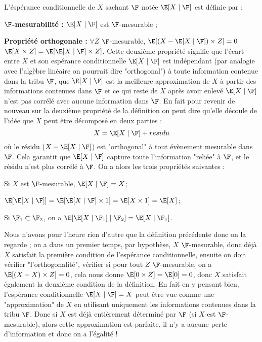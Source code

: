 L'éspérance conditionnelle de $X$ sachant $\F$ notée $\E[X \mid \F]$ est définie par :
\ben
    \item \textbf{$\F$-mesurabilité :} $\E[X\mid \F]$ est $\F$-mesurable ;
    \item \textbf{Propriété orthogonale :} $\forall Z$ $\F$-mesurable, $\E[(X - \E[X \mid \F])\times Z ] = 0$ \ssi $\E[X\times Z] = \E[\E[X\mid \F] \times Z]$.
    \bn
    Cette deuxième propriété signifie que l'écart entre $X$ et son espérance conditionnelle $\E[X\mid \F]$ est indépendant (par analogie avec l'algèbre linéaire on pourrait dire "orthogonal") à toute information contenue dans la tribu $\F$, \ie que $\E[X\mid \F]$ est la meilleure approximation de $X$ à partir des informations contenues dans $\F$ et ce qui reste de $X$ après avoir enlevé $\E[X\mid \F]$ n'est pas corrélé avec aucune information dans $\F$.
    \en
\een
\ed
{} En fait pour revenir de nouveau sur la deuxième propriété de la définition on peut dire qu'elle découle de l'idée que $X$ peut être décomposé en deux parties : $$X = \E[X\mid \F] + residu$$ où le résidu ($X- \E[X\mid \F]$) est "orthogonal" à tout évènement mesurable dans $\F$. Cela garantit que $\E[X\mid \F]$ capture toute l'information "reliée" à $\F$, et le résidu n'est plus corrélé à $\F$.
\bp
On a alors les trois propriétés suivantes :
\ben
    \item Si $X$ est $\F$-mesurable, $\E[X\mid \F] = X$;
    \item $\E[\E[X\mid \F]] = \E[\E[X\mid \F]\times 1] = \E[X \times 1] = \E[X]$;
    \item Si $\F_1 \subset \F_2$, on a $\E[\E[X\mid \F_1]\mid \F_2] = \E[X\mid \F_1]$.
\een
\ep
\bpf[(esquisse)]
\ben
    \item Nous n'avons pour l'heure rien d'autre que la définition précédente donc on la regarde  ; on a dans un premier temps, par hypothèse, $X$ $\F$-mesurable, donc déjà $X$ satisfait la première condition de l'espérance conditionnelle, ensuite on doit vérifier "l'orthogonalité", \ie vérifier si pour tout $Z$ $\F$-mesurable, on a $\E[(X-X)\times Z] = 0$, cela nous donne $\E[0\times Z] =\E[0] = 0$, donc $X$ satisfait également la deuxième condition de la définition.
    \bn
    En fait en y pensant bien, l'espérance conditionnelle $\E[X\mid \F] = X$ peut être vue comme une "approximation" de $X$ en utilisant uniquement les informations contenues dans la tribu $\F$. Donc si $X$ est déjà entièrement déterminé par $\F$ (\ie si $X$ est $\F$-mesurable), alors cette approximation est parfaite, il n'y a aucune perte d'information et donc on a l'égalité ! 
